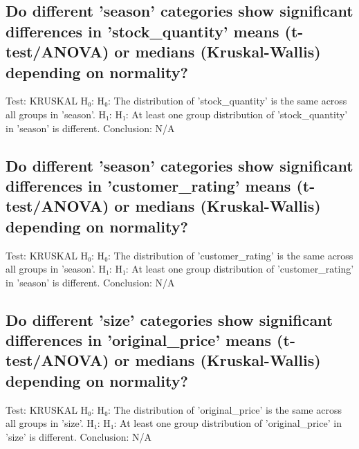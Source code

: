 \documentclass{article}%
\begin{document}
%
\subsection{Do different 'season' categories show significant differences in 'stock\_quantity' means (t{-}test/ANOVA) or medians (Kruskal{-}Wallis) depending on normality?}%
\label{subsec:Dodifferentseasoncategoriesshowsignificantdifferencesinstockquantitymeans(t{-}test/ANOVA)ormedians(Kruskal{-}Wallis)dependingonnormality?}%
Test: KRUSKAL\newline%
H₀: H₀: The distribution of 'stock\_quantity' is the same across all groups in 'season'.\newline%
H₁: H₁: At least one group distribution of 'stock\_quantity' in 'season' is different.\newline%
Conclusion: N/A

%
\subsection{Do different 'season' categories show significant differences in 'customer\_rating' means (t{-}test/ANOVA) or medians (Kruskal{-}Wallis) depending on normality?}%
\label{subsec:Dodifferentseasoncategoriesshowsignificantdifferencesincustomerratingmeans(t{-}test/ANOVA)ormedians(Kruskal{-}Wallis)dependingonnormality?}%
Test: KRUSKAL\newline%
H₀: H₀: The distribution of 'customer\_rating' is the same across all groups in 'season'.\newline%
H₁: H₁: At least one group distribution of 'customer\_rating' in 'season' is different.\newline%
Conclusion: N/A

%
\subsection{Do different 'size' categories show significant differences in 'original\_price' means (t{-}test/ANOVA) or medians (Kruskal{-}Wallis) depending on normality?}%
\label{subsec:Dodifferentsizecategoriesshowsignificantdifferencesinoriginalpricemeans(t{-}test/ANOVA)ormedians(Kruskal{-}Wallis)dependingonnormality?}%
Test: KRUSKAL\newline%
H₀: H₀: The distribution of 'original\_price' is the same across all groups in 'size'.\newline%
H₁: H₁: At least one group distribution of 'original\_price' in 'size' is different.\newline%
Conclusion: N/A
\end{document}
